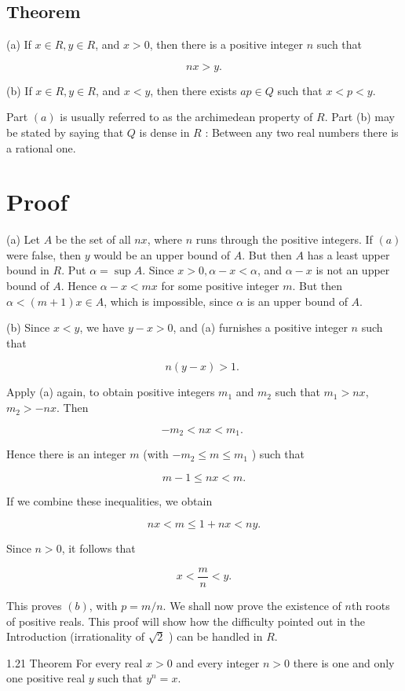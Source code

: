 \documentclass[10pt]{article}
\begin{document}
\subsection{Theorem}
(a) If $x \in R, y \in R$, and $x>0$, then there is a positive integer $n$ such that

$$
n x>y .
$$

(b) If $x \in R, y \in R$, and $x<y$, then there exists $a p \in Q$ such that $x<p<y$.

Part $(a)$ is usually referred to as the archimedean property of $R$. Part (b) may be stated by saying that $Q$ is dense in $R$ : Between any two real numbers there is a rational one.

\section{Proof}
(a) Let $A$ be the set of all $n x$, where $n$ runs through the positive integers. If $(a)$ were false, then $y$ would be an upper bound of $A$. But then $A$ has a least upper bound in $R$. Put $\alpha=\sup A$. Since $x>0, \alpha-x<\alpha$, and $\alpha-x$ is not an upper bound of $A$. Hence $\alpha-x<m x$ for some positive integer $m$. But then $\alpha<(m+1) x \in A$, which is impossible, since $\alpha$ is an upper bound of $A$.

(b) Since $x<y$, we have $y-x>0$, and (a) furnishes a positive integer $n$ such that

$$
n(y-x)>1 \text {. }
$$

Apply (a) again, to obtain positive integers $m_{1}$ and $m_{2}$ such that $m_{1}>n x$, $m_{2}>-n x$. Then

$$
-m_{2}<n x<m_{1} \text {. }
$$

Hence there is an integer $m$ (with $-m_{2} \leq m \leq m_{1}$ ) such that

$$
m-1 \leq n x<m .
$$

If we combine these inequalities, we obtain

$$
n x<m \leq 1+n x<n y .
$$

Since $n>0$, it follows that

$$
x<\frac{m}{n}<y .
$$

This proves $(b)$, with $p=m / n$. We shall now prove the existence of $n$th roots of positive reals. This proof will show how the difficulty pointed out in the Introduction (irrationality of $\sqrt{2}$ ) can be handled in $R$.

1.21 Theorem For every real $x>0$ and every integer $n>0$ there is one and only one positive real $y$ such that $y^{n}=x$.
\end{document}
